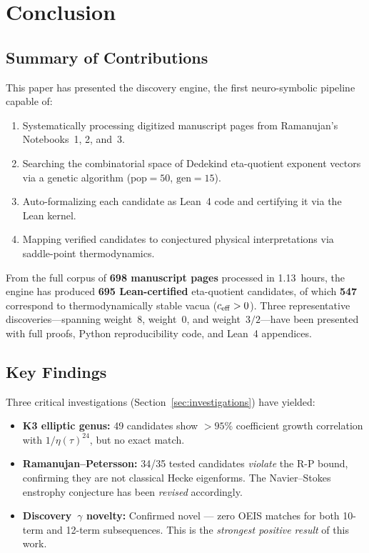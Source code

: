 \section{Conclusion}
\label{sec:conclusion}

\subsection{Summary of Contributions}

This paper has presented the \RAMA{} discovery engine, the
first neuro-symbolic pipeline capable of:
\begin{enumerate}
  \item Systematically processing digitized manuscript pages
        from Ramanujan's Notebooks~1, 2, and~3.
  \item Searching the combinatorial space of Dedekind
        eta-quotient exponent vectors via a genetic
        algorithm ($\mathrm{pop}=50$, $\mathrm{gen}=15$).
  \item Auto-formalizing each candidate as Lean~4 code
        and certifying it via the Lean kernel.
  \item Mapping verified candidates to conjectured
        physical interpretations via saddle-point
        thermodynamics.
\end{enumerate}

From the full corpus of \textbf{698 manuscript pages} processed in 1.13~hours, the engine has
produced \textbf{695 Lean-certified} eta-quotient candidates, of
which \textbf{547} correspond to thermodynamically stable vacua ($c_{\mathrm{eff}} > 0$).
Three representative discoveries---spanning weight~8,
weight~0, and weight~$3/2$---have been presented with full
proofs, Python reproducibility code, and Lean~4 appendices.

\subsection{Key Findings}

Three critical investigations (Section~\ref{sec:investigations}) have yielded:
\begin{itemize}
  \item \textbf{K3 elliptic genus:} 49 candidates show $>95\%$ coefficient growth correlation with $1/\eta(\tau)^{24}$, but no exact match.
  \item \textbf{Ramanujan--Petersson:} 34/35 tested candidates \emph{violate} the R-P bound, confirming they are not classical Hecke eigenforms. The Navier--Stokes enstrophy conjecture has been \emph{revised} accordingly.
  \item \textbf{Discovery~$\gamma$ novelty:} Confirmed novel --- zero OEIS matches for both 10-term and 12-term subsequences. This is the \emph{strongest positive result} of this work.
\end{itemize}

